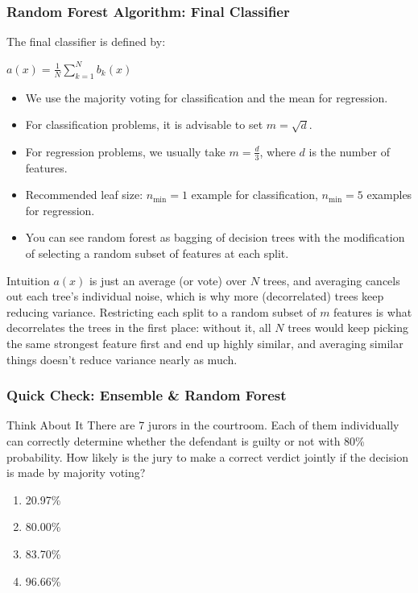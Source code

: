 \begin{frame}[fragile]\frametitle{Random Forest Algorithm: Final Classifier}
The final classifier is defined by:

$a(x) = \frac{1}{N}\sum_{k = 1}^N b_k(x)$

\begin{itemize}
\item We use the majority voting for classification and the mean for regression.
\item For classification problems, it is advisable to set $m = \sqrt{d}$.
\item For regression problems, we usually take $m = \frac{d}{3}$, where $d$ is the number of features.
\item Recommended leaf size: $n_\text{min} = 1$ example for classification, $n_\text{min} = 5$ examples for regression.
\item You can see random forest as bagging of decision trees with the modification of selecting a random subset of features at each split.
\end{itemize}

\begin{block}{Intuition}
$a(x)$ is just an average (or vote) over $N$ trees, and averaging cancels out each tree's
individual noise, which is why more (decorrelated) trees keep reducing variance. Restricting
each split to a random subset of $m$ features is what decorrelates the trees in the first
place: without it, all $N$ trees would keep picking the same strongest feature first and end
up highly similar, and averaging similar things doesn't reduce variance nearly as much.
\end{block}
\end{frame}


\begin{frame}[fragile]\frametitle{Quick Check: Ensemble \& Random Forest}
\begin{block}{Think About It}
There are 7 jurors in the courtroom. Each of them individually can correctly determine whether the defendant is guilty or not with 80\% probability. How likely is the jury to make a correct verdict jointly if the decision is made by majority voting?
\begin{enumerate}
\item[A.] 20.97\%
\item[B.] 80.00\%
\item[C.] 83.70\%
\item[D.] 96.66\%
\end{enumerate}
\end{block}
\end{frame}


